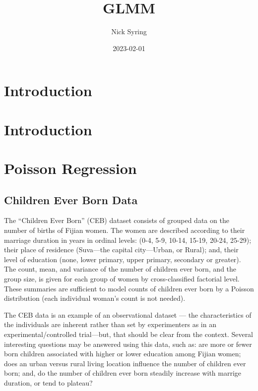 \documentclass[
]{book}
\title{GLMM}
\author{Nick Syring}
\date{2023-02-01}
\begin{document}
\maketitle

{
\setcounter{tocdepth}{1}
\tableofcontents
}
\hypertarget{introduction}{%
\chapter{Introduction}\label{introduction}}

\hypertarget{intro}{%
\chapter{Introduction}\label{intro}}

\hypertarget{poisson-regression}{%
\chapter{Poisson Regression}\label{poisson-regression}}

\hypertarget{children-ever-born-data}{%
\section{Children Ever Born Data}\label{children-ever-born-data}}

The ``Children Ever Born'' (CEB) dataset consists of grouped data on the number of births of Fijian women. The women are described according to their marriage duration in years in ordinal levels: (0-4, 5-9, 10-14, 15-19, 20-24, 25-29); their place of residence (Suva---the capital city---Urban, or Rural); and, their level of education (none, lower primary, upper primary, secondary or greater). The count, mean, and variance of the number of children ever born, and the group size, is given for each group of women by cross-classified factorial level. These summaries are sufficient to model counts of children ever born by a Poisson distribution (each individual woman's count is not needed).

The CEB data is an example of an observational dataset --- the characteristics of the individuals are inherent rather than set by experimenters as in an experimental/controlled trial---but, that should be clear from the context. Several interesting questions may be answered using this data, such as: are more or fewer born children associated with higher or lower education among Fijian women; does an urban versus rural living location influence the number of children ever born; and, do the number of children ever born steadily increase with marrige duration, or tend to plateau?
\end{document}

